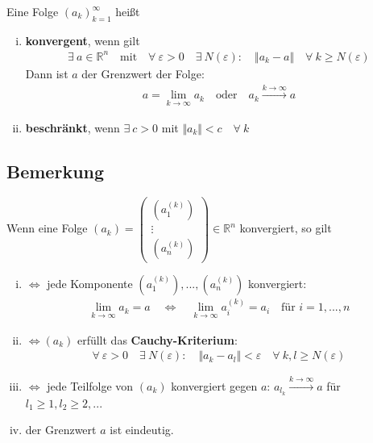 \documentclass[11pt,a4paper]{book}
\newcommand {\Rn}	{\mathbb{R}^n}
\newcommand{\1}    	{\mathbbm{1}}
\begin{document}
Eine Folge \((a_k)_{k=1}^\infty \) heißt
\begin{enumerate}[(i)]
	\item \textbf{konvergent}, wenn gilt
	\begin{align*}
		\exists~ a \in \Rn \quad \textrm{mit} \quad \forall~ \varepsilon > 0 \quad \exists~ N(\varepsilon) : \quad \Vert a_k - a \Vert \quad \forall~ k \geqslant N(\varepsilon)
	\end{align*}
	Dann ist \(a\) der Grenzwert der Folge:
	\begin{align*}
		a = \lim_{k \rightarrow \infty} a_k \quad \textrm{oder} \quad a_k \stackrel{k \rightarrow \infty}{\rightarrow} a
	\end{align*}
	\item \textbf{beschränkt}, wenn \(\exists~ c > 0 \) mit \(\Vert a_k \Vert < c \quad \forall~ k \)
\end{enumerate}

\subsection{Bemerkung}

Wenn eine Folge \((a_k) = \left( \begin{array}{c} \left( a_1^{(k)} \right) \\ \vdots \\ \left( a_n^{(k)} \right)	\end{array} \right) \in \Rn\) konvergiert, so gilt
\begin{enumerate}[(i)]
	\item  \(\Leftrightarrow\) jede Komponente \( \left( a_1^{(k)}\right), ..., \left( a_n^{(k)} \right) \) konvergiert:
	\begin{align*}
		\lim_{k \rightarrow \infty} a_k = a \quad \Leftrightarrow \quad \lim_{k \rightarrow \infty} a_i^{(k)} = a_i \quad \textrm{für } i = 1, ..., n
	\end{align*}
	\item \(\Leftrightarrow (a_k) \) erfüllt das \textbf{Cauchy-Kriterium}:
	\begin{align*}
		\forall~ \varepsilon > 0 \quad \exists~ N(\varepsilon) : \quad \Vert a_k - a_l \Vert < \varepsilon \quad \forall~ k,l \geqslant N(\varepsilon)
	\end{align*}
	\item \(\Leftrightarrow\) jede Teilfolge von \((a_k)\) konvergiert gegen \(a\): \( a_{l_k} \stackrel{k \rightarrow \infty}{\rightarrow} a \) für \( l_1 \geqslant 1, l_2 \geqslant 2, ...\)
	\item der Grenzwert \(a\) ist eindeutig.
\end{enumerate}
\end{document}
